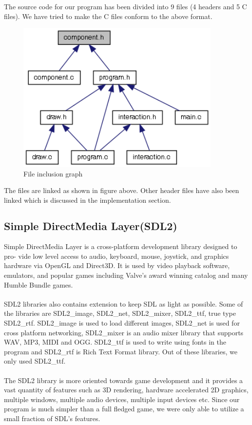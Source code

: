 \documentclass[report.tex]{subfiles}
\begin{document}
    The source code for our program has been divided into 9 files (4 headers and 5 C files). We have tried to make the C files conform to the above format.
    \begin{figure}[H]
        \centering
        \includegraphics[width=4in]{graphics/component_8h__dep__incl.png}
        \caption{File inclusion graph}
    \end{figure}
    The files are linked as shown in figure above. Other header files have also been linked which is discussed in the implementation section.
    \subsection{Simple DirectMedia Layer(SDL2)}
    Simple DirectMedia Layer is a cross-platform development library designed to pro-
    vide low level access to audio, keyboard, mouse, joystick, and graphics hardware
    via OpenGL and Direct3D. It is used by video playback software, emulators, and
    popular games including Valve’s award winning catalog and many Humble Bundle
    games.\\\\
    SDL2 libraries also contains extension to keep SDL as light as possible. Some of the
    libraries are SDL2\_image, SDL2\_net, SDL2\_mixer, SDL2\_ttf, true type SDL2\_rtf. SDL2\_image
    is used to load different images, SDL2\_net is used for cross platform networking,
    SDL2\_mixer is an audio mixer library that supports WAV, MP3, MIDI and OGG.
    SDL2\_ttf is used to write using fonts in the program and SDL2\_rtf is Rich Text Format
    library. Out of these libraries, we only used SDL2\_ttf.
    \\\\
    The SDL2 library is more oriented towards game development and it provides a vast quantity of features such as 3D rendering, hardware accelerated 2D graphics, multiple windows, multiple audio devices, multiple input devices etc. 
    Since our program is much simpler than a full fledged game, we were only able to utilize a small fraction of SDL's features.
\end{document}
